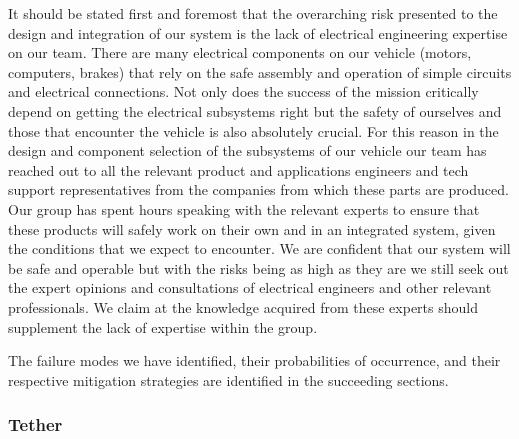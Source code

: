 It should be stated first and foremost that the overarching risk presented to the design and integration of our system is the lack of electrical engineering expertise on our team. There are many electrical components on our vehicle (motors, computers, brakes) that rely on the safe assembly and operation of simple circuits and electrical connections. Not only does the success of the mission critically depend on getting the electrical subsystems right but the safety of ourselves and those that encounter the vehicle is also absolutely crucial. For this reason in the design and component selection of the subsystems of our vehicle our team has reached out to all the relevant product and applications engineers and tech support representatives from the companies from which these parts are produced. Our group has spent hours speaking with the relevant experts to ensure that these products will safely work on their own and in an integrated system, given the conditions that we expect to encounter. We are confident that our system will be safe and operable but with the risks being as high as they are we still seek out the expert opinions and consultations of electrical engineers and other relevant professionals. We claim at the knowledge acquired from these experts should supplement the lack of expertise within the group.

The failure modes we have identified, their probabilities of occurrence, and their respective mitigation strategies are identified in the succeeding sections.


\subsubsection{Tether}


